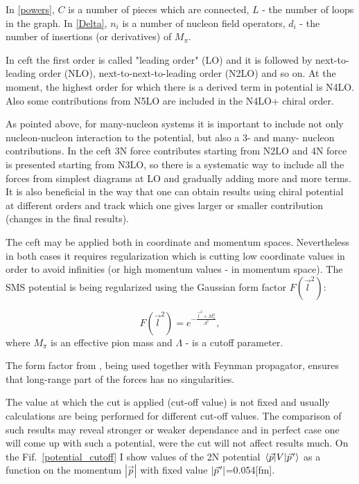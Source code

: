In \ref*{powers}, $C$ is a number of pieces which are connected, $L$ - the number of loops in the graph.
In \ref*{Delta}, $n_i$ is a number of nucleon field operators, $d_i$ - the number of insertions
(or derivatives) of  $M_\pi$.

In \gls*{ceft} the first order is called "leading order" (LO)  and it is followed 
by next-to-leading order (NLO), next-to-next-to-leading order (N2LO) and so on.
At the moment, the highest order for which there is a derived term in potential
is N4LO. Also some contributions from N5LO are included in the N4LO+ chiral order. 


As pointed above, for many-nucleon systems it is important to include not 
only nucleon-nucleon interaction to the potential, but also a 3- and many- nucleon
contributions. In the \gls*{ceft} 3N force contributes starting from N2LO and
4N force is presented starting from N3LO, so there is a systematic
way to include all the forces from simplest diagrams at LO and gradually
adding more and more terms. It is also beneficial in the way that 
one can obtain results using chiral potential at different
orders and track which one gives larger or smaller contribution (changes in the
final results).

The \gls*{ceft} may be applied both in coordinate and momentum spaces.
Nevertheless in both cases it requires regularization which is cutting 
low coordinate values in order to avoid infinities 
(or high momentum values - in momentum space). 
The SMS potential is being regularized using the Gaussian form factor
$F(\vec{l}^2)$:

\begin{equation}
    F(\vec{l}^2) = e^{-\frac{\vec{l}^2 + M_\pi^2}{\Lambda^2}},
    \label{regulator}
\end{equation}
where $M_\pi$ is an effective pion mass and $\Lambda$ - is a cutoff parameter.

The form factor from , being used together with Feynman propagator,
ensures that long-range part of the forces has no singularities. 

The value at which
the cut is applied (cut-off value) is not fixed and usually calculations
are being performed for different cut-off values. The comparison
of such results may reveal stronger or weaker dependance and in perfect
case one will come up with such a potential, were the cut will
not affect results much. On the Fif.~\ref{potential_cutoff} 
I show values of the 2N potential $\matrixel{\vec{p}}{V}{\pvec{p}}$
as a function on the momentum $|\vec{p}|$ with fixed value $|\pvec{p}|$=0.054[fm].
 


